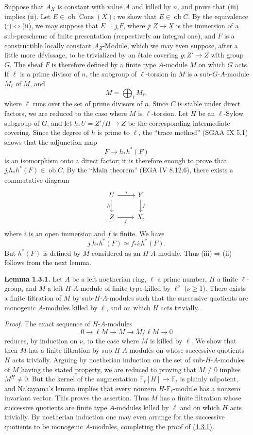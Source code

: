 \documentclass[11pt]{article}
\providecommand{\Cons}{\operatorname{Cons}}
\newcommand{\F}{\mathbb{F}}
\newcommand{\ob}{\operatorname{ob}}
\providecommand{\ob}{\operatorname{ob}}
\begin{document}
Suppose that $A_X$ is constant with value $A$ and killed by $n$, and prove that (iii) implies (ii). Let $E\in\ob\Cons(X)$; we show that $E\in\ob C$. By the equivalence (i)$\Leftrightarrow$(ii), we may suppose that $E=j_!F$, where $j:Z\to X$ is the immersion of a sub-prescheme of finite presentation (respectively an integral one), and $F$ is a constructible locally constant $A_Z$-Module, which we may even suppose, after a little more dévissage, to be trivialized by an étale covering $g:Z'\to Z$ with group $G$. The sheaf $F$ is therefore defined by a finite type $A$-module $M$ on which $G$ acts. If $\ell$ is a prime divisor of $n$, the subgroup of $\ell$-torsion in $M$ is a sub-$G$-$A$-module $M_\ell$ of $M$, and
\[
        M=\bigoplus_\ell M_\ell,
\]
where $\ell$ runs over the set of prime divisors of $n$. Since $C$ is stable under direct factors, we are reduced to the case where $M$ is $\ell$-torsion. Let $H$ be an $\ell$-Sylow subgroup of $G$, and let $h:U=Z'/H\to Z$ be the corresponding intermediate covering. Since the degree of $h$ is prime to $\ell$, the ``trace method'' (SGAA IX 5.1) shows that the adjunction map
\[
        F\longrightarrow h_*h^*(F)
\]
is an isomorphism onto a direct factor; it is therefore enough to prove that $j_!h_*h^*(F)\in\ob C$. By the ``Main theorem'' (EGA IV 8.12.6), there exists a commutative diagram
\[
\begin{tikzcd}
U \arrow[r,"i"] \arrow[d,"h"'] & Y \arrow[d,"f"]\\
Z \arrow[r,"j"'] & X,
\end{tikzcd}
\]
where $i$ is an open immersion and $f$ is finite. We have
\[
        j_!h_*h^*(F) \simeq f_* i_! h^*(F).
\]
But $h^*(F)$ is defined by $M$ considered as an $H$-$A$-module. Thus (iii)$\Rightarrow$(ii) follows from the next lemma.

\label{sga5:I:lemma:1.3.1}\textbf{Lemma 1.3.1.} Let $A$ be a left noetherian ring, $\ell$ a prime number, $H$ a finite $\ell$-group, and $M$ a left $H$-$A$-module of finite type killed by $\ell^\nu$ ($\nu\geq1$). There exists a finite filtration of $M$ by sub-$H$-$A$-modules such that the successive quotients are monogenic $A$-modules killed by $\ell$, and on which $H$ acts trivially.

\emph{Proof.} The exact sequence of $H$-$A$-modules
\[
        0\longrightarrow \ell M\longrightarrow M\longrightarrow M/\ell M\longrightarrow 0
\]
reduces, by induction on $\nu$, to the case where $M$ is killed by $\ell$. We show that then $M$ has a finite filtration by sub-$H$-$A$-modules on whose successive quotients $H$ acts trivially. Arguing by noetherian induction on the set of sub-$H$-$A$-modules of $M$ having the stated property, we are reduced to proving that $M\neq0$ implies $M^H\neq0$. But the kernel of the augmentation $\F_\ell[H]\to\F_\ell$ is plainly nilpotent, and Nakayama's lemma implies that every nonzero $H$-$\F_\ell$-module has a nonzero invariant vector. This proves the assertion. Thus $M$ has a finite filtration whose successive quotients are finite type $A$-modules killed by $\ell$ and on which $H$ acts trivially. By noetherian induction one may even arrange for the successive quotients to be monogenic $A$-modules, completing the proof of \hyperref[sga5:I:lemma:1.3.1]{(1.3.1)}.
\end{document}

